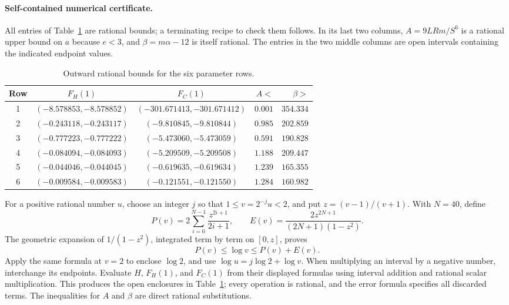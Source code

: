 \documentclass[11pt]{article}
\theoremstyle{definition}
\theoremstyle{remark}
\begin{document}
\paragraph{Self-contained numerical certificate.}
All entries of Table~\ref{tab:constant-certificate} are rational bounds;
a terminating recipe to check them follows.  In its last two columns,
$A=9LRm/S^6$ is a rational upper bound on $a$ because $e<3$, and
$\beta=m\alpha-12$ is itself rational.  The entries in the two middle
columns are open intervals containing the indicated endpoint values.
\begin{table}[ht]
\centering
\small
\begin{tabular}{c c c r r}
\toprule
Row & $F_H(1)$ & $F_C(1)$ & $A<$ & $\beta>$\\
\midrule
1 & $(-8.578853,-8.578852)$ & $(-301.671413,-301.671412)$ & $0.001$ & $354.334$\\
2 & $(-0.243118,-0.243117)$ & $(-9.810845,-9.810844)$ & $0.985$ & $202.859$\\
3 & $(-0.777223,-0.777222)$ & $(-5.473060,-5.473059)$ & $0.591$ & $190.828$\\
4 & $(-0.084094,-0.084093)$ & $(-5.209509,-5.209508)$ & $1.188$ & $209.447$\\
5 & $(-0.044046,-0.044045)$ & $(-0.619635,-0.619634)$ & $1.239$ & $165.355$\\
6 & $(-0.009584,-0.009583)$ & $(-0.121551,-0.121550)$ & $1.284$ & $160.982$\\
\bottomrule
\end{tabular}
\caption{Outward rational bounds for the six parameter rows.}
\label{tab:constant-certificate}
\end{table}

For a positive rational number $u$, choose an integer $j$ so that
$1\le v=2^{-j}u<2$, and put $z=(v-1)/(v+1)$.  With $N=40$, define
\[
 P(v)=2\sum_{i=0}^{N-1}\frac{z^{2i+1}}{2i+1},\qquad
 E(v)=\frac{2z^{2N+1}}{(2N+1)(1-z^2)}.
\]
The geometric expansion of $1/(1-z^2)$, integrated term by term on
$[0,z]$, proves
\[
 P(v)\le\log v\le P(v)+E(v).
\]
Apply the same formula at $v=2$ to enclose $\log2$, and use
$\log u=j\log2+\log v$.  When multiplying an interval by a negative
number, interchange its endpoints.  Evaluate $H$, $F_H(1)$, and $F_C(1)$
from their displayed formulas using interval addition and rational scalar
multiplication.  This produces the open enclosures in
Table~\ref{tab:constant-certificate}; every operation is rational, and
the error formula specifies all discarded terms.  The inequalities for
$A$ and $\beta$ are direct rational substitutions.
\end{document}
